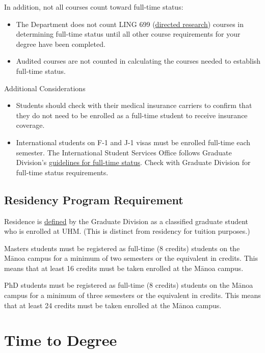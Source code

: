 \documentclass[
]{book}
\providecommand{\tightlist}{%
  \setlength{\itemsep}{0pt}\setlength{\parskip}{0pt}}
\begin{document}
In addition, not all courses count toward full-time status:

\begin{itemize}
\tightlist
\item
  The Department does not count LING 699 (\hyperref[ling699]{directed research}) courses in determining full-time status until all other course requirements for your degree have been completed.
\item
  Audited courses are not counted in calculating the courses needed to establish full-time status.
\end{itemize}

Additional Considerations

\begin{itemize}
\tightlist
\item
  Students should check with their medical insurance carriers to confirm that they do not need to be enrolled as a full-time student to receive insurance coverage.
\item
  International students on F-1 and J-1 visas must be enrolled full-time each semester. The International Student Services Office follows Graduate Division's \href{https://manoa.hawaii.edu/graduate/course-loads-full-time-definition/}{guidelines for full-time status}. Check with Graduate Division for full-time status requirements.
\end{itemize}

\subsection{Residency Program Requirement}\label{residency-program-requirement}

Residence is \href{https://manoa.hawaii.edu/graduate/residency-program-requirement/}{defined} by the Graduate Division as a classified graduate student who is enrolled at UHM. (This is distinct from residency for tuition purposes.)

Masters students must be registered as full-time (8 credits) students on the Mānoa campus for a minimum of two semesters or the equivalent in credits. This means that at least 16 credits must be taken enrolled at the Mānoa campus.

PhD students must be registered as full-time (8 credits) students on the Mānoa campus for a minimum of three semesters or the equivalent in credits. This means that at least 24 credits must be taken enrolled at the Mānoa campus.

\section{Time to Degree}\label{time}
\end{document}
